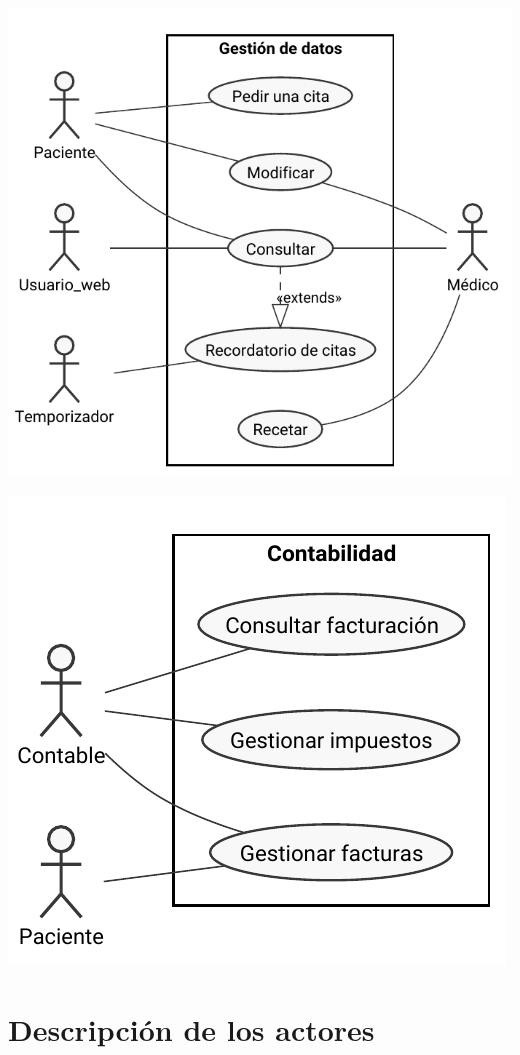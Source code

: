 \documentclass[11pt,a4paper]{article}
\begin{document}
\begin{center}
\includegraphics[scale=0.7]{diagramas/gestion_datos}

\includegraphics[scale=0.7]{diagramas/contabilidad}
\end{center}

\section{Descripción de los actores}
\end{document}
